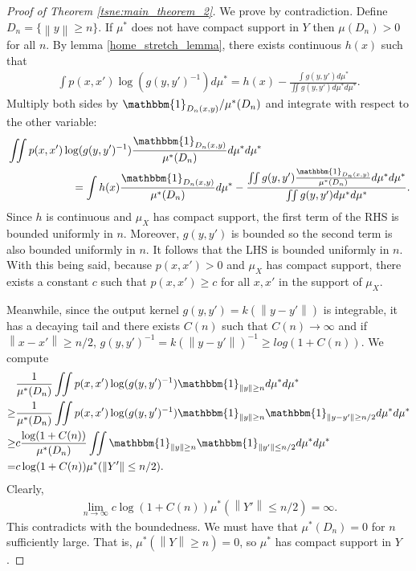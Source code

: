 \documentclass[10pt]{article}
\newcommand{\norm}[1]{\left\lVert#1\right\rVert}
\newenvironment{Proof of lemma}{\noindent{\bf Proof of Lemma}}{\hfill$\Box$\newline}
\newenvironment{Proof of claim}{\noindent{\bf Proof of claim}}{\hfill$\Box$\newline}
\newenvironment{Proof of theorem}{\noindent{\bf Proof of Theorem}}{\hfill\scriptsize{$\Box$}\newline}
\newenvironment{Proof of theorems}{\noindent{\bf Proof of Theorems}}{\hfill$\Box$\newline}
\newenvironment{Proof of proposition}{\noindent{\bf Proof of Proposition}}{\hfill$\Box$\newline}
\newenvironment{Proof of propositions}{\noindent{\bf Proof of Propositions}}{\hfill$\Box$\newline}
\newenvironment{Proof of exercise}{\noindent{\it Proof of Exercise:}}{\hfill$\Box$}
\numberwithin{equation}{section}
\begin{document}
\begin{proof}[Proof of Theorem \ref{tsne:main_theorem_2}] \label{tsne:sec:main_theorem_2}
    We prove by contradiction. Define $D_n = \{\norm{y} \geq n\}$. If $\mu^*$ does not have compact support in $Y$ then $\mu(D_n)>0$ for all $n$. By lemma \ref{home_stretch_lemma}, there exists continuous $h(x)$ such that
    \begin{align}
        \int p(x,x') \log(g(y,y')^{-1})d\mu^* = h(x) -  \frac{\int g(y,y')d\mu^*}{\iint g(y,y')d\mu^* d\mu^*}.
    \end{align}
    Multiply both sides by $\mathbbm{1}_{D_n(x,y)}/\mu^*(D_n)$ and integrate with respect to the other variable:
    \begin{align}
         & \iint p(x,x') \log(g(y,y')^{-1}) \frac{\mathbbm{1}_{D_n(x,y)}}{\mu^*(D_n)}d\mu^* d\mu^* \nonumber                                                                                          \\
         & \qquad \qquad \qquad= \int h(x)\frac{\mathbbm{1}_{D_n(x,y)}}{\mu^*(D_n)}d\mu^* -  \frac{\iint g(y,y')\frac{\mathbbm{1}_{D_n(x,y)}}{\mu^*(D_n)} d\mu^* d\mu^*}{\iint g(y,y')d\mu^* d\mu^*}.
    \end{align}
    Since $h$ is continuous and $\mu_X$ has compact support, the first term of the RHS is bounded uniformly in $n$. Moreover, $g(y,y')$  is bounded so the second term is also bounded uniformly in $n$. It follows that the LHS is bounded uniformly in $n$. With this being said, because $p(x,x')>0$ and $\mu_X$ has compact support, there exists a constant $c$ such that $p(x,x') \geq c$ for all $x,x'$ in the support of $\mu_X$.

    Meanwhile, since the output kernel $g(y,y') = k(\norm{y-y'})$ is integrable, it
    has a decaying tail and there exists $C(n)$ such that $C(n) \to \infty$ and if
    $\norm{x-x'} \geq n/2$, $g(y,y')^{-1}=k(\norm{y-y'})^{-1} \geq log (1+C(n))$.
    We compute
    \begin{align}
             & \frac{1}{\mu^*(D_n)} \iint p(x,x') \log(g(y,y')^{-1}) \mathbbm{1}_{\norm{y} \geq n} d\mu^* d\mu^* \nonumber                                   \\
        \geq & \frac{1}{\mu^*(D_n)} \iint p(x,x') \log(g(y,y')^{-1}) \mathbbm{1}_{\norm{y} \geq n} \mathbbm{1}_{\norm{y-y'} \geq n/2}d\mu^* d\mu^* \nonumber \\
        \geq & c \frac{\log(1+C(n))}{\mu^*(D_n)} \iint \mathbbm{1}_{\norm{y} \geq n} \mathbbm{1}_{\norm{y'} \leq n/2}d\mu^* d\mu^* \nonumber                 \\
        =    & c\log(1+C(n)) \mu^*(\norm{Y'}\leq n/2).
    \end{align}
    Clearly,
    \begin{align}
        \lim_{n \to \infty} c\log(1+C(n)) \mu^*(\norm{Y'}\leq n/2) = \infty.
    \end{align}
    This contradicts with the boundedness. We must have that $\mu^*(D_n)=0$ for $n$ sufficiently large. That is, $\mu^*(\norm{Y} \geq n)=0$, so $\mu^*$ has compact support in $Y$.
\end{proof}

\nocite{*}

\end{document}
